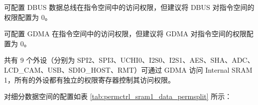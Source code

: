 \documentclass[main\_\_CN.tex]{subfiles}
\begin{document}
\begin{table}[H]
\begin{threeparttable}
\begin{tabular}{ |l|l|l|c|c|c|l| }
    \end{tabular}
        \begin{tablenotes}
            \item [A] 可配置 DBUS 数据总线在指令空间中的访问权限，但建议将 DBUS 对指令空间的权限配置为 0。
            \item [B] 可配置 GDMA 在指令空间中的访问权限，但建议将 GDMA 对指令空间的权限配置为 0。
            \item [C] \chipname{} 共有 9 个外设（分别为 SPI2、SPI3、UCHI0、I2S0、I2S1、AES、SHA、ADC、LCD\_CAM、USB、SDIO\_HOST、RMT）可通过 GDMA 访问 Internal SRAM 1，所有的外设都有独立的权限寄存器控制其访问权限。
        \end{tablenotes}
     \end{threeparttable}
    \end{table}

对细分数据空间的配置如表 \ref{tab:permctrl_sram1_data_permsplit} 所示：
\end{document}
